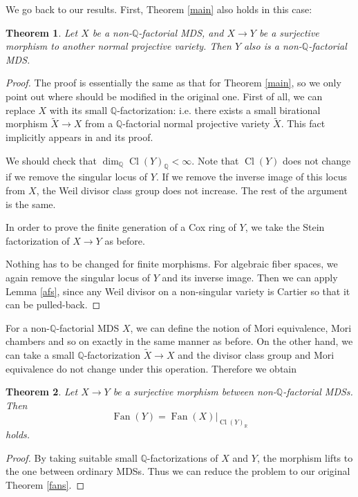 \documentclass[12pt,twoside]{amsart}
\newtheorem{theo}{Theorem}[section]
\theoremstyle{definition}
\newcommand\Cl{\mathop{\mathrm{Cl}}\nolimits}
\newcommand\Fan{\mathop{\mathrm{Fan}}}
\newcommand\bq{\mathbb{Q}}
\newcommand\br{\mathbb{R}}
\begin{document}
We go back to our results. First, Theorem \ref{main} also holds in this case:
\begin{theo}\label{main'}
Let $X$ be a non-$\bq$-factorial MDS, and $X\to Y$ be a surjective morphism to another
normal projective variety. Then $Y$ also is a non-$\bq$-factorial MDS.
\end{theo}
\begin{proof}
The proof is essentially the same as that for Theorem \ref{main}, so we only point out where should be
modified in the original one.
First of all, we can replace $X$ with its small $\bq$-factorization: i.e.
there exists a small birational morphism $\tilde{X}\to X$ from a $\bq$-factorial normal projective variety
$\tilde{X}$. This fact implicitly appears in \cite[Theorem 2.3]{ahl} and its proof.

We should check that $\dim_{\bq}\Cl{(Y)}_{\bq}<\infty$. Note that $\Cl{(Y)}$ does not change
if we remove the singular locus of $Y$. If we remove the inverse image of this locus from $X$, the
Weil divisor class group does not increase. The rest of the argument is the same.

In order to prove the finite generation of a Cox ring of $Y$, we take the Stein factorization of $X\to Y$
as before.

Nothing has to be changed for finite morphisms.
For algebraic fiber spaces, we again remove the singular locus of $Y$ and its inverse image.
Then we can apply Lemma \ref{afs}, since any Weil divisor on a non-singular variety is Cartier so that
it can be pulled-back.
\end{proof}

For a non-$\bq$-factorial MDS $X$, we can define the notion of Mori equivalence, Mori chambers and so on
exactly in the same manner as before. On the other hand, we can take a small $\bq$-factorization $\tilde{X}\to X$
and the divisor class group and Mori equivalence do not change under this operation. Therefore we obtain
\begin{theo}\label{fans'}
Let $X\to Y$ be a surjective morphism between non-$\bq$-factorial MDSs. Then
\begin{equation*}
\Fan{(Y)}=\Fan{(X)}|_{\Cl{(Y)}_{\br}}
\end{equation*}
holds.
\end{theo}
\begin{proof}
By taking suitable small $\bq$-factorizations of $X$ and $Y$, the morphism lifts to the one between
ordinary MDSs. Thus we can reduce the problem to our original Theorem \ref{fans}.
\end{proof}
\end{document}
